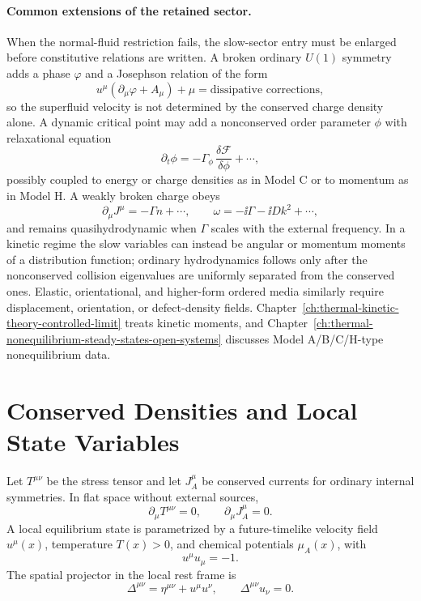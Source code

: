 \paragraph{Common extensions of the retained sector.}
When the normal-fluid restriction fails, the slow-sector entry must be
enlarged before constitutive relations are written.  A broken ordinary
\(U(1)\) symmetry adds a phase \(\varphi\) and a Josephson relation of the
form
\[
  u^\mu(\partial_\mu\varphi+A_\mu)+\mu=\text{dissipative corrections},
\]
so the superfluid velocity is not determined by the conserved charge density
alone.  A dynamic critical point may add a nonconserved order parameter
\(\phi\) with relaxational equation
\[
  \partial_t\phi=-\Gamma_\phi\,\frac{\delta \mathcal F}{\delta\phi}
  +\cdots ,
\]
possibly coupled to energy or charge densities as in Model C or to momentum
as in Model H.  A weakly broken charge obeys
\[
  \partial_\mu J^\mu=-\Gamma n+\cdots,
  \qquad
  \omega=-\ii\Gamma-\ii Dk^2+\cdots,
\]
and remains quasihydrodynamic when \(\Gamma\) scales with the external
frequency.  In a kinetic regime the slow variables can instead be angular or
momentum moments of a distribution function; ordinary hydrodynamics follows
only after the nonconserved collision eigenvalues are uniformly separated
from the conserved ones.  Elastic, orientational, and higher-form ordered
media similarly require displacement, orientation, or defect-density fields.
Chapter~\ref{ch:thermal-kinetic-theory-controlled-limit} treats kinetic
moments, and Chapter~\ref{ch:thermal-nonequilibrium-steady-states-open-systems}
discusses Model A/B/C/H-type nonequilibrium data.

\section{Conserved Densities and Local State Variables}

Let \(T^{\mu\nu}\) be the stress tensor and let \(J^\mu_A\) be conserved
currents for ordinary internal symmetries.  In flat space without external
sources,
\begin{equation}
  \partial_\mu T^{\mu\nu}=0,
  \qquad
  \partial_\mu J^\mu_A=0 .
  \label{eq:hydro-flat-ward-identities}
\end{equation}
A local equilibrium state is parametrized by a future-timelike velocity field
\(u^\mu(x)\), temperature \(T(x)>0\), and chemical potentials
\(\mu_A(x)\), with
\[
  u^\mu u_\mu=-1.
\]
The spatial projector in the local rest frame is
\[
  \Delta^{\mu\nu}=\eta^{\mu\nu}+u^\mu u^\nu,
  \qquad
  \Delta^{\mu\nu}u_\nu=0.
\]

